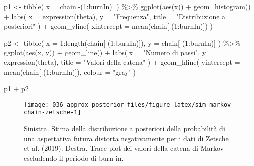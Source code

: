 \documentclass[
]{memoir}
\newenvironment{Shaded}{\begin{snugshade}}{\end{snugshade}}
\newcommand{\AttributeTok}[1]{\textcolor[rgb]{0.77,0.63,0.00}{#1}}
\newcommand{\DecValTok}[1]{\textcolor[rgb]{0.00,0.00,0.81}{#1}}
\newcommand{\FunctionTok}[1]{\textcolor[rgb]{0.00,0.00,0.00}{#1}}
\newcommand{\NormalTok}[1]{#1}
\newcommand{\OtherTok}[1]{\textcolor[rgb]{0.56,0.35,0.01}{#1}}
\newcommand{\SpecialCharTok}[1]{\textcolor[rgb]{0.00,0.00,0.00}{#1}}
\newcommand{\StringTok}[1]{\textcolor[rgb]{0.31,0.60,0.02}{#1}}
\begin{document}
\begin{Shaded}
\begin{Highlighting}[]
\NormalTok{p1 }\OtherTok{\textless{}{-}} \FunctionTok{tibble}\NormalTok{(}
  \AttributeTok{x =}\NormalTok{ chain[}\SpecialCharTok{{-}}\NormalTok{(}\DecValTok{1}\SpecialCharTok{:}\NormalTok{burnIn)]}
\NormalTok{  ) }\SpecialCharTok{\%\textgreater{}\%}
  \FunctionTok{ggplot}\NormalTok{(}\FunctionTok{aes}\NormalTok{(x)) }\SpecialCharTok{+}
  \FunctionTok{geom\_histogram}\NormalTok{() }\SpecialCharTok{+}
  \FunctionTok{labs}\NormalTok{(}
    \AttributeTok{x =} \FunctionTok{expression}\NormalTok{(theta),}
    \AttributeTok{y =} \StringTok{"Frequenza"}\NormalTok{,}
    \AttributeTok{title =} \StringTok{"Distribuzione a posteriori"}
\NormalTok{  ) }\SpecialCharTok{+}
  \FunctionTok{geom\_vline}\NormalTok{(}
    \AttributeTok{xintercept =} \FunctionTok{mean}\NormalTok{(chain[}\SpecialCharTok{{-}}\NormalTok{(}\DecValTok{1}\SpecialCharTok{:}\NormalTok{burnIn)])}
\NormalTok{  )}

\NormalTok{p2 }\OtherTok{\textless{}{-}} \FunctionTok{tibble}\NormalTok{(}
  \AttributeTok{x =} \DecValTok{1}\SpecialCharTok{:}\FunctionTok{length}\NormalTok{(chain[}\SpecialCharTok{{-}}\NormalTok{(}\DecValTok{1}\SpecialCharTok{:}\NormalTok{burnIn)]),}
  \AttributeTok{y =}\NormalTok{ chain[}\SpecialCharTok{{-}}\NormalTok{(}\DecValTok{1}\SpecialCharTok{:}\NormalTok{burnIn)]}
\NormalTok{  ) }\SpecialCharTok{\%\textgreater{}\%}
  \FunctionTok{ggplot}\NormalTok{(}\FunctionTok{aes}\NormalTok{(x, y)) }\SpecialCharTok{+}
  \FunctionTok{geom\_line}\NormalTok{() }\SpecialCharTok{+}
  \FunctionTok{labs}\NormalTok{(}
    \AttributeTok{x =} \StringTok{"Numero di passi"}\NormalTok{,}
    \AttributeTok{y =} \FunctionTok{expression}\NormalTok{(theta),}
    \AttributeTok{title =} \StringTok{"Valori della catena"}
\NormalTok{  ) }\SpecialCharTok{+}
  \FunctionTok{geom\_hline}\NormalTok{(}
    \AttributeTok{yintercept =} \FunctionTok{mean}\NormalTok{(chain[}\SpecialCharTok{{-}}\NormalTok{(}\DecValTok{1}\SpecialCharTok{:}\NormalTok{burnIn)]),}
    \AttributeTok{colour =} \StringTok{"gray"}
\NormalTok{  )}

\NormalTok{p1 }\SpecialCharTok{+}\NormalTok{ p2}
\end{Highlighting}
\end{Shaded}

\begin{figure}

{\centering \texttt{[image: 036\_approx\_posterior\_files/figure-latex/sim-markov-chain-zetsche-1]} 

}

\caption{Sinistra. Stima della distribuzione a posteriori della probabilità di una aspettativa futura distorta negativamente per i dati di Zetsche et al. (2019). Destra. Trace plot dei valori della catena di Markov escludendo il periodo di burn-in.}\label{fig:sim-markov-chain-zetsche}
\end{figure}
\end{document}
